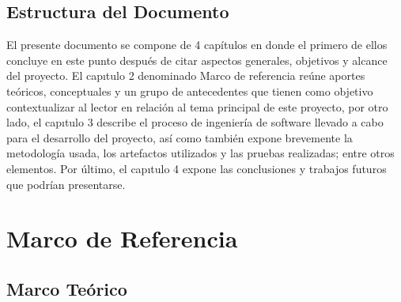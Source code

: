 \documentclass[12pt,letterpaper,openany]{book}
\begin{document}
\section{Estructura del Documento}
El presente documento se compone de 4 capítulos en donde el primero de ellos concluye en este punto después de citar aspectos generales, objetivos y alcance del proyecto. El capıtulo 2 denominado Marco de referencia reúne aportes teóricos, conceptuales y un grupo de antecedentes que tienen como objetivo contextualizar al lector en relación al tema principal de este proyecto, por otro lado, el capıtulo 3 describe el proceso de ingeniería de software llevado a cabo para el desarrollo del proyecto, así como también expone brevemente la metodología usada, los artefactos utilizados y las pruebas realizadas; entre otros elementos. Por último, el capıtulo 4 expone las conclusiones y trabajos futuros que podrían presentarse.


\chapter{Marco de Referencia}\label{cap.marco_de_referencia}

\section{Marco Teórico}
\end{document}
